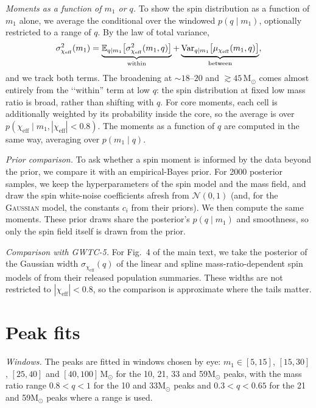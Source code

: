 \documentclass[%
 onecolumn,
 amsmath,amssymb,
 aps,
 prl,
 nofootinbib,nobibnotes,
]{revtex4-2}
\newcommand{\Msun}{\ensuremath{\mathrm{M}_{\odot}}}
\newcommand{\chieff}{\ensuremath{\chi_{\mathrm{eff}}}}
\newcommand{\gaussianspins}{\textsc{Gaussian}\xspace}
\newcommand{\featTen}{10\xspace}
\newcommand{\featTwenty}{21\xspace}
\newcommand{\featThirtyFive}{33\xspace}
\newcommand{\featSixty}{59\xspace}
\begin{document}
\textit{Moments as a function of $m_1$ or $q$.} To show the spin distribution as a function of $m_1$ alone, we average the conditional over the windowed $p(q \mid m_1)$, optionally restricted to a range of $q$. By the law of total variance,
\begin{equation}
    \sigma^2_{\chieff}(m_1) = \underbrace{\mathbb{E}_{q \mid m_1}\big[\sigma^2_{\chieff}(m_1, q)\big]}_{\rm within} + \underbrace{\mathrm{Var}_{q \mid m_1}\big[\mu_{\chieff}(m_1, q)\big]}_{\rm between},
\end{equation}
and we track both terms. The broadening at $\sim 18$--$20$ and $\gtrsim 45\,\Msun$ comes almost entirely from the \lq\lq within'' term at low $q$: the spin distribution at fixed low mass ratio is broad, rather than shifting with $q$. For core moments, each cell is additionally weighted by its probability inside the core, so the average is over $p(\chieff \mid m_1, |\chieff| < 0.8)$. The moments as a function of $q$ are computed in the same way, averaging over $p(m_1 \mid q)$.

\textit{Prior comparison.} To ask whether a spin moment is informed by the data beyond the prior, we compare it with an empirical-Bayes prior. For 2000 posterior samples, we keep the hyperparameters of the spin model and the mass field, and draw the spin white-noise coefficients afresh from $\mathcal{N}(0, 1)$ (and, for the \gaussianspins model, the constants $c_i$ from their priors). We then compute the same moments. These prior draws share the posterior's $p(q \mid m_1)$ and smoothness, so only the spin field itself is drawn from the prior.

\textit{Comparison with \ac{GWTC-5}.} For Fig.~4 of the main text, we take the posterior of the Gaussian width $\sigma_{\chieff}(q)$ of the linear and spline mass-ratio-dependent spin models of \citet{LIGOScientific:2026ctl} from their released population summaries. These widths are not restricted to $|\chieff| < 0.8$, so the comparison is approximate where the tails matter.

\section{Peak fits}
\label{sm: peak fits}

\textit{Windows.} The peaks are fitted in windows chosen by eye: $m_1 \in [5, 15]$, $[15, 30]$, $[25, 40]$ and $[40, 100]\,\Msun$ for the \featTen, \featTwenty, \featThirtyFive and \featSixty $\Msun$ peaks, with the mass ratio range $0.8 < q < 1$ for the \featTen and \featThirtyFive $\Msun$ peaks and $0.3 < q < 0.65$ for the \featTwenty and \featSixty $\Msun$ peaks where a range is used.
\end{document}
